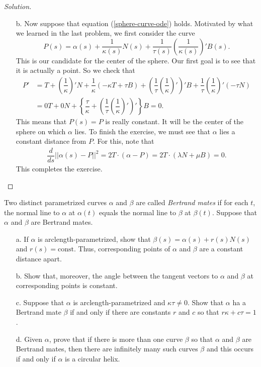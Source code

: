 \documentclass[Shifrin_Solutions_Spring_2015]{subfiles}
\begin{document}
\begin{proof}[Solution] {$\ $}
\begin{itemize}
\item[b.]  Now suppose that equation (\ref{sphere-curve-ode}) holds. Motivated by what we learned in the last problem, we first consider the curve
\[
P(s) = \alpha(s) + \dfrac{1}{\kappa(s)} N(s) + \dfrac{1}{\tau(s)}\left( \dfrac{1}{\kappa(s)}\right)' B(s) .
\]
This is our candidate for the center of the sphere. Our first goal is to see that it is actually a point. So we check that
\[
\begin{split}
P' &= T + \left(\dfrac{1}{\kappa}\right)' N + \dfrac{1}{\kappa} (-\kappa T + \tau B ) + \left(\dfrac{1}{\tau}\left( \dfrac{1}{\kappa}\right)'\right)' B + \dfrac{1}{\tau}\left(\dfrac{1}{\kappa}\right)' (-\tau N) \\
	& = 0 T + 0 N + \left\{  \dfrac{\tau}{\kappa} + \left(\dfrac{1}{\tau} \left(\dfrac{1}{\kappa}\right)' \right)' \right\} B = 0 .
\end{split}
\]
This means that $P(s) = P$ is really constant. It will be the center of the sphere on which $\alpha$ lies. To finish the exercise, we must see that $\alpha$ lies a constant distance from $P$. For this, note that
\[
\begin{split}
\dfrac{d}{ds} ||\alpha(s) - P||^2 = 2 T \cdot (\alpha-P) = 2 T \cdot ( \lambda N + \mu B) = 0.
\end{split}
\]
This completes the exercise.
\end{itemize}
\end{proof}

\vspace{.5cm}


\begin{exercise}
Two distinct parametrized curves $\alpha$ and $\beta$ are called \emph{Bertrand mates} if for each $t$, the normal line to $\alpha$ at $\alpha(t)$ equals the normal line to $\beta$ at $\beta(t)$. Suppose that $\alpha$ and $\beta$ are Bertrand mates.
\begin{itemize}
\item[a.] If $\alpha$ is arclength-parametrized, show that $\beta(s) = \alpha(s) + r(s) N(s)$ and $r(s) = \mbox{const}$. Thus, corresponding points of $\alpha$ and $\beta$ are a constant distance apart.
\item[b.] Show that, moreover, the angle between the tangent vectors to $\alpha$ and $\beta$ at corresponding points is constant.
\item[c.] Suppose that $\alpha$ is arclength-parametrized and $\kappa\tau \neq 0$. Show that $\alpha$ ha a Bertrand mate $\beta$ if and only if there are constants $r$ and $c$ so that $r\kappa + c\tau =1$.
\item[d.] Given $\alpha$, prove that if there is more than one curve $\beta$ so that $\alpha$ and $\beta$ are Bertrand mates, then there are infinitely many such curves $\beta$ and this occurs if and only if $\alpha$ is a circular helix.
\end{itemize}
\end{exercise}
\end{document}

